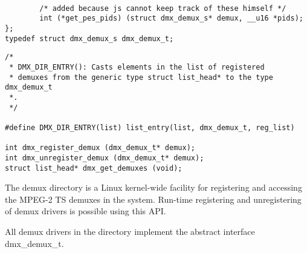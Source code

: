 \begin{verbatim}
   
        /* added because js cannot keep track of these himself */
        int (*get_pes_pids) (struct dmx_demux_s* demux, __u16 *pids);
}; 
typedef struct dmx_demux_s dmx_demux_t; 
\end{verbatim}


\label{demuxdir}

\begin{verbatim}
/* 
 * DMX_DIR_ENTRY(): Casts elements in the list of registered 
 * demuxes from the generic type struct list_head* to the type dmx_demux_t
 *. 
 */ 

#define DMX_DIR_ENTRY(list) list_entry(list, dmx_demux_t, reg_list)

int dmx_register_demux (dmx_demux_t* demux); 
int dmx_unregister_demux (dmx_demux_t* demux); 
struct list_head* dmx_get_demuxes (void); 
\end{verbatim}

\clearpage


The demux directory is a Linux kernel-wide facility for registering and 
accessing the MPEG-2 TS demuxes in the system. Run-time registering and 
unregistering of demux drivers is possible using this API. 

All demux drivers in the directory implement the abstract interface dmx\_demux\_t.



